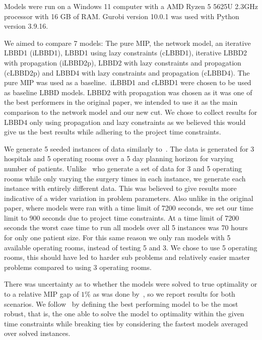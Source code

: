 Models were run on a Windows 11 computer with a AMD Ryzen 5 5625U 2.3GHz processor with 16 GB of RAM\@. Gurobi version 10.0.1 was used with Python version 3.9.16. 

We aimed to compare 7 models: The pure MIP, the network model, an iterative LBBD1 (iLBBD1), LBBD1 using lazy constraints (cLBBD1), iterative LBBD2 with propagation (iLBBD2p), LBBD2 with lazy constraints and propagation (cLBBD2p) and LBBD4 with lazy constraints and propagation (cLBBD4). The pure MIP was used as a baseline.\ iLBBD1 and cLBBD1  were chosen to be used as baseline LBBD models. LBBD2 with propagation was chosen as it was one of the best performers in the original paper, we intended to use it as the main comparison to the network model and our new cut. We chose to collect results for LBBD4 only using propagation and lazy constraints as we believed this would give us the best results while adhering to the project time constraints.

We generate 5 seeded instances of data similarly to~\cite{roshanaei2017propagating}. The data is generated for 3 hospitals and 5 operating rooms over a 5 day planning horizon for varying number of patients. Unlike~\cite{roshanaei2017propagating} who generate a set of data for 3 and 5 operating rooms while only varying the surgery times in each instance, we generate each instance with entirely different data. This was believed to give results more indicative of a wider variation in problem parameters. Also unlike in the original paper, where models were ran with a time limit of 7200 seconds, we set our time limit to 900 seconds due to project time constraints. At a time limit of 7200 seconds the worst case time to run all models over all 5 instances was 70 hours for only one patient size. For this same reason we only ran models with 5 available operating rooms, instead of testing 5 and 3. We chose to use 5 operating rooms, this should have led to harder sub problems and relatively easier master problems compared to using 3 operating rooms\cite{roshanaei2017propagating}. 

There was uncertainty as to whether the models were solved to true optimality or to a relative MIP gap of $1\%$ as was done by~\cite{guo}, so we report results for both scenarios. We follow~\cite{roshanaei2017propagating} by defining the best performing model to be the most robust, that is, the one able to solve the model to optimality within the given time constraints while breaking ties by considering the fastest models averaged over solved instances.

